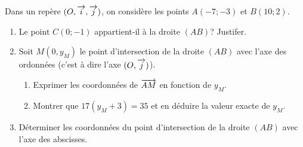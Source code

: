 \documentclass[a4paper,11pt,DIV15,BCOR0mm]{scrartcl}
\begin{document}
\begin{exercice}
 Dans un repère $(O,\overrightarrow{i},\overrightarrow{j})$, on considère les points $A(-7;-3)$ et $B(10;2)$.
\begin{enumerate}
 \item Le point $C(0;-1)$ appartient-il à la droite $(AB)$? Justifer.
 \item Soit $M(0,y_M)$ le point d'intersection de la droite $(AB)$ avec l'axe des ordonnées (c'est à dire l'axe $(O,\overrightarrow{j})$).
  \begin{enumerate}
    \item Exprimer les coordonnées de $\overrightarrow{AM}$ en fonction de $y_M$.
    \item Montrer que $17(y_M+3)=35$ et en déduire la valeur exacte      de $y_M$.
    \end{enumerate}
\item Déterminer les coordonnées du point d'intersection de la droite $(AB)$ 
avec l'axe des abscisses.
\end{enumerate}
\end{exercice}
\end{document}
